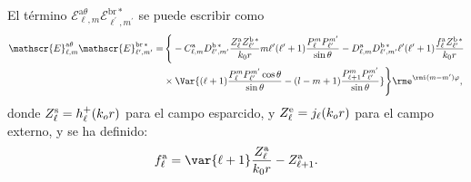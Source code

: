 El término $\mathscr{E}_{\ell, m}^{\text{a}\theta}\mathscr{E}_{\ell^{\prime}, m^{\prime}}^{\text{br}\,*}$ se puede escribir como
\begin{align}
\mathscr{E}_{\ell, m}^{\text{a}\theta}\mathscr{E}_{\ell^{\prime}, m^{\prime}}^{\text{br}\,*}=& \, \Bigg\{-C_{\ell,m}^{\rm a}D_{\ell^{\prime}, m^{\prime}}^{\rm b \, *}\frac{Z_{\ell}^{\rm a}Z_{\ell^{\prime}}^{\rm b\, *}}{k_0 r} m \ell^{\prime}(\ell^{\prime}+1)\frac{P_{\ell}^{m}P_{\ell^{\prime}}^{m^{\prime}}}{\sin\theta}-D_{\ell, m}^{\rm a}D_{\ell^{\prime}, m^{\prime}}^{\rm b \, *} \ell^{\prime}(\ell^{\prime}+1)\frac{f_{\ell}^{\rm a}Z_{\ell^{\prime}}^{\rm b \, *}}{k_0 r}\nonumber\\
& \times \Var{(\ell+1) \frac{P_{\ell}^m P_{\ell^{\prime}}^{m^{\prime}}\cos\theta}{\sin\theta}-(l-m+1)\frac{P_{\ell+1}^{m}P_{\ell^{\prime}}^{m^{\prime}}}{\sin\theta}}\Bigg\}\rme^{\rmi (m-m^{\prime})\varphi},
\end{align}
donde $Z_{\ell}^{\rm s}=h_{\ell}^{+}(k_o r)$ para el campo esparcido, y $Z_{\ell}^{\rm e}=j_{\ell}(k_o r)$ para el campo externo, y se ha definido:
\begin{equation}
f_{\ell}^{\rm a}= \var{\ell + 1} \frac{Z_{\ell}^{\rm a}}{k_0 r}-Z_{\ell+1}^{\rm a}.
\end{equation}
